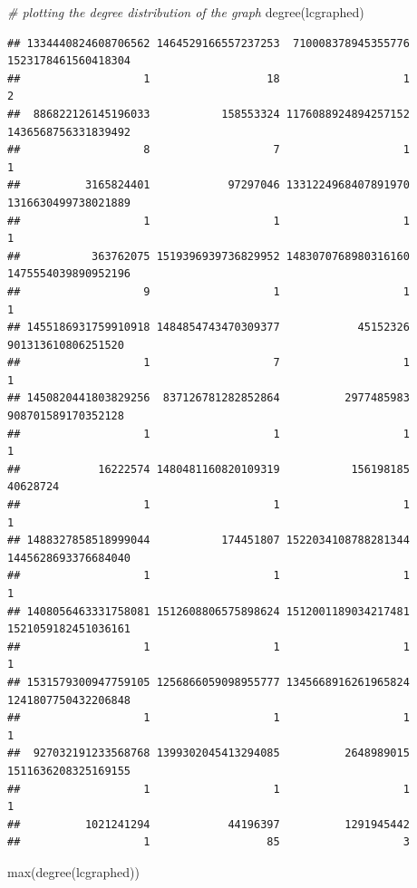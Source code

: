 \documentclass[
]{article}
\newenvironment{Shaded}{\begin{snugshade}}{\end{snugshade}}
\newcommand{\CommentTok}[1]{\textcolor[rgb]{0.56,0.35,0.01}{\textit{#1}}}
\newcommand{\FunctionTok}[1]{\textcolor[rgb]{0.00,0.00,0.00}{#1}}
\newcommand{\NormalTok}[1]{#1}
\begin{document}
\begin{Shaded}
\begin{Highlighting}[]
\CommentTok{\# plotting the degree distribution of the graph}
\FunctionTok{degree}\NormalTok{(lcgraphed)}
\end{Highlighting}
\end{Shaded}

\begin{verbatim}
## 1334440824608706562 1464529166557237253  710008378945355776 1523178461560418304 
##                   1                  18                   1                   2 
##  886822126145196033           158553324 1176088924894257152 1436568756331839492 
##                   8                   7                   1                   1 
##          3165824401            97297046 1331224968407891970 1316630499738021889 
##                   1                   1                   1                   1 
##           363762075 1519396939736829952 1483070768980316160 1475554039890952196 
##                   9                   1                   1                   1 
## 1455186931759910918 1484854743470309377            45152326  901313610806251520 
##                   1                   7                   1                   1 
## 1450820441803829256  837126781282852864          2977485983  908701589170352128 
##                   1                   1                   1                   1 
##            16222574 1480481160820109319           156198185            40628724 
##                   1                   1                   1                   1 
## 1488327858518999044           174451807 1522034108788281344 1445628693376684040 
##                   1                   1                   1                   1 
## 1408056463331758081 1512608806575898624 1512001189034217481 1521059182451036161 
##                   1                   1                   1                   1 
## 1531579300947759105 1256866059098955777 1345668916261965824 1241807750432206848 
##                   1                   1                   1                   1 
##  927032191233568768 1399302045413294085          2648989015 1511636208325169155 
##                   1                   1                   1                   1 
##          1021241294            44196397          1291945442 
##                   1                  85                   3
\end{verbatim}

\begin{Shaded}
\begin{Highlighting}[]
\FunctionTok{max}\NormalTok{(}\FunctionTok{degree}\NormalTok{(lcgraphed))}
\end{Highlighting}
\end{Shaded}
\end{document}
